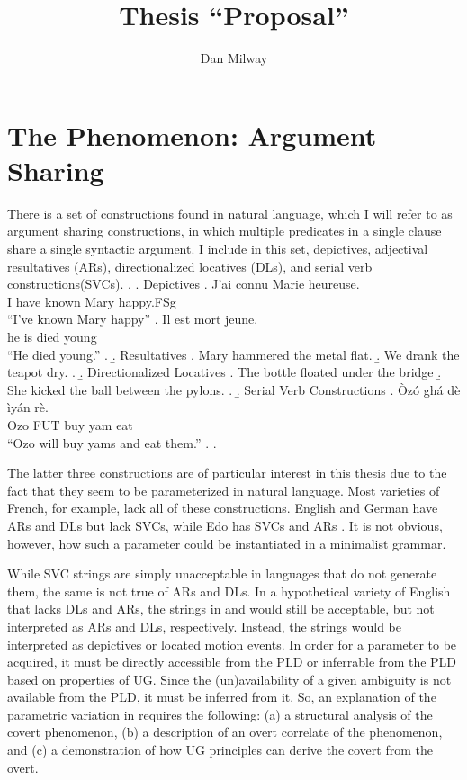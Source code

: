 \documentclass[letterpaper]{article}
\title{Thesis ``Proposal''}
\author{Dan Milway}
\begin{document}
\maketitle

\section{The Phenomenon: Argument Sharing}
There is a set of constructions found in natural language, which I will refer to as argument sharing constructions, in which multiple predicates in a single clause share a single syntactic argument.
I include in this set, depictives, adjectival resultatives (ARs), directionalized locatives (DLs), and serial verb constructions(SVCs).
\ex.
  \a. Depictives \parencite[French,][]{legendre1997secondary}
    \ag. J'ai connu Marie heureuse.\\
    {I have} known Mary happy.FSg\\
    ``I've known Mary happy''
    \bg. Il est mort jeune.\\
    he is died young\\
    ``He died young.''
    \z.
  \b. Resultatives
    \a. Mary hammered the metal flat.
    \b. We drank the teapot dry.
    \z.
  \b. Directionalized Locatives
    \a. The bottle floated under the bridge
    \b. She kicked the ball between the pylons.
    \z.
  \b. Serial Verb Constructions \parencite[Edo,][]{bakerstewart1999double}
    \ag. \`Oz\'o gh\'a d\`e ìy\'an r\`e.\\
    Ozo FUT buy yam eat\\
    ``Ozo will buy yams and eat them.''
    \z.
  \z.

The latter three constructions are of particular interest in this thesis due to the fact that they seem to be parameterized in natural language.
Most varieties of French, for example, lack all of these constructions. English and German have ARs and DLs but lack SVCs, while Edo has SVCs and ARs \parencite{bakerstewart1999double}.
It is not obvious, however, how such a parameter could be instantiated in a minimalist grammar.

While SVC strings are simply unacceptable in languages that do not generate them, the same is not true of ARs and DLs.
In a hypothetical variety of English that lacks DLs and ARs, the strings in \Last[b] and \Last[c] would still be acceptable, but not interpreted as ARs and DLs, respectively.
Instead, the strings would be interpreted as depictives or located motion events.
In order for a parameter to be acquired, it must be directly accessible from the PLD or inferrable from the PLD based on properties of UG.
Since the (un)availability of a given ambiguity is not available from the PLD, it must be inferred from it.
So, an explanation of the parametric variation in \Last requires the following:
(a) a structural analysis of the covert phenomenon, (b) a description of an overt correlate of the phenomenon, and (c) a demonstration of how UG principles can derive
the covert from the overt.
\end{document}
